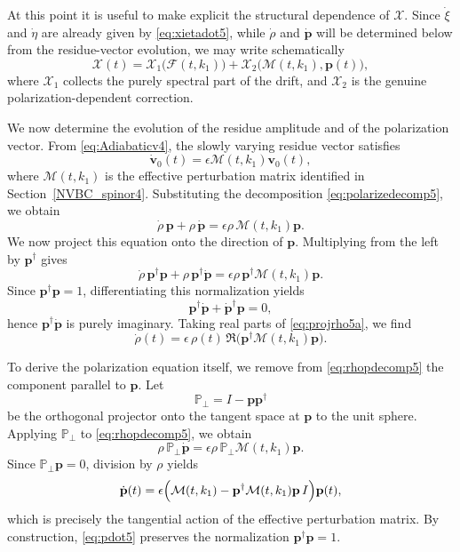 \documentclass[11pt]{amsart}
\theoremstyle{definition}
\numberwithin{equation}{section}
\begin{document}
At this point it is useful to make explicit the structural dependence of $\mathcal X$. Since $\dot\xi$ and $\dot\eta$ are already given by \eqref{eq:xietadot5}, while $\dot\rho$ and $\dot{\mathbf p}$ will be determined below from the residue-vector evolution, we may write schematically
\begin{equation}
\mathcal{X}(t)
=
\mathcal{X}_1\bigl(\mathcal F(t,k_1)\bigr)
+
\mathcal{X}_2\bigl(\mathcal M(t,k_1),\mathbf p(t)\bigr),
\label{eq:Xstructure5}
\end{equation}
where $\mathcal X_1$ collects the purely spectral part of the drift, and $\mathcal X_2$ is the genuine polarization-dependent correction.

We now determine the evolution of the residue amplitude and of the polarization vector. From \eqref{eq:Adiabaticv4}, the slowly varying residue vector satisfies
\begin{equation}
\dot{\mathbf v}_0(t)=\epsilon \mathcal M(t,k_1)\mathbf v_0(t),
\label{eq:vdotabstract5}
\end{equation}
where $\mathcal M(t,k_1)$ is the effective perturbation matrix identified in Section~\ref{NVBC_spinor4}. Substituting the decomposition \eqref{eq:polarizedecomp5}, we obtain
\begin{equation}
\dot{\rho}\,\mathbf p+\rho\,\dot{\mathbf p}
=
\epsilon \rho\,\mathcal M(t,k_1)\mathbf p.
\label{eq:rhopdecomp5}
\end{equation}
We now project this equation onto the direction of $\mathbf p$. Multiplying from the left by $\mathbf p^\dagger$ gives
\begin{equation}
\dot{\rho}\,\mathbf p^\dagger\mathbf p
+
\rho\,\mathbf p^\dagger \dot{\mathbf p}
=
\epsilon \rho\,\mathbf p^\dagger \mathcal M(t,k_1)\mathbf p.
\label{eq:projrho5a}
\end{equation}
Since $\mathbf p^\dagger\mathbf p=1$, differentiating this normalization yields
\[
\mathbf p^\dagger \dot{\mathbf p}+\dot{\mathbf p}^\dagger \mathbf p=0,
\]
hence $\mathbf p^\dagger\dot{\mathbf p}$ is purely imaginary. Taking real parts of \eqref{eq:projrho5a}, we find
\begin{equation}
\dot{\rho}(t)=\epsilon\,\rho(t)\,\Re\bigl(\mathbf p^\dagger \mathcal M(t,k_1)\mathbf p\bigr).
\label{eq:rhodot5}
\end{equation}

To derive the polarization equation itself, we remove from \eqref{eq:rhopdecomp5} the component parallel to $\mathbf p$. Let
\[
\mathbb P_\perp = I-\mathbf p\mathbf p^\dagger
\]
be the orthogonal projector onto the tangent space at $\mathbf p$ to the unit sphere. Applying $\mathbb P_\perp$ to \eqref{eq:rhopdecomp5}, we obtain
\[
\rho\,\mathbb P_\perp \dot{\mathbf p}
=
\epsilon \rho\,\mathbb P_\perp \mathcal M(t,k_1)\mathbf p.
\]
Since $\mathbb P_\perp \mathbf p=0$, division by $\rho$ yields
\begin{equation}
\dot{\mathbf p}(t)
=
\epsilon\Bigl(
\mathcal M(t,k_1)-\mathbf p^\dagger \mathcal M(t,k_1)\mathbf p\,I
\Bigr)\mathbf p(t),
\label{eq:pdot5}
\end{equation}
which is precisely the tangential action of the effective perturbation matrix. By construction, \eqref{eq:pdot5} preserves the normalization $\mathbf p^\dagger\mathbf p=1$.
\end{document}
